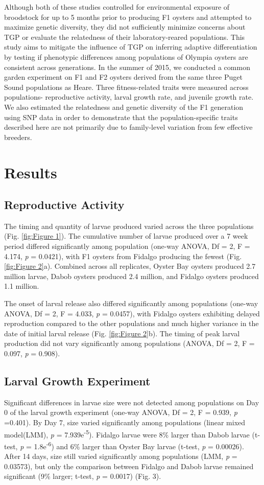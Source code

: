 \documentclass[fleqn,10pt]{wlscirep}
\begin{document}
Although both of these studies controlled for environmental exposure of broodstock for up to 5 months prior to producing F1 oysters and attempted to maximize genetic diversity, they did not sufficiently minimize concerns about TGP or evaluate the relatedness of their laboratory-reared populations. This study aims to mitigate the influence of TGP on inferring adaptive differentiation by testing if phenotypic differences among populations of Olympia oysters are consistent across generations. In the summer of 2015, we conducted a common garden experiment on F1 and F2 oysters derived from the same three Puget Sound populations as Heare. Three fitness-related traits were measured across populations- reproductive activity, larval growth rate, and juvenile growth rate. We also estimated the relatedness and genetic diversity of the F1 generation using SNP data in order to demonstrate that the population-specific traits described here are not primarily due to family-level variation from few effective breeders.

\section*{Results}
\subsection*{Reproductive Activity}
The timing and quantity of larvae produced varied across the three populations (Fig. \ref{fig:Figure 1}). The cumulative number of larvae produced over a 7 week period differed significantly among population (one-way ANOVA, Df = 2, F = 4.174, \textit{p} = 0.0421), with F1 oysters from Fidalgo producing the fewest (Fig. \ref{fig:Figure 2}a). Combined across all replicates, Oyster Bay oysters produced 2.7 million larvae, Dabob oysters produced 2.4 million, and Fidalgo oysters produced 1.1 million.\par
The onset of larval release also differed significantly among populations (one-way ANOVA, Df = 2, F = 4.033, \textit{p} = 0.0457), with Fidalgo oysters exhibiting delayed reproduction compared to the other populations and much higher variance in the date of initial larval release (Fig. \ref{fig:Figure 2}b). The timing of peak larval production did not vary significantly among populations (ANOVA, Df = 2, F = 0.097, \textit{p} = 0.908).

\subsection*{Larval Growth Experiment}
Significant differences in larvae size were not detected among populations on Day 0 of the larval growth experiment (one-way ANOVA, Df = 2, F = 0.939, \textit{p} =0.401). By Day 7, size varied significantly among populations (linear mixed model(LMM), \textit{p} = 7.939e\textsuperscript{-5}). Fidalgo larvae were 8\% larger than Dabob larvae (t-test, \textit{p} = 1.8e\textsuperscript{-6}) and 6\% larger than Oyster Bay larvae (t-test, \textit{p} = 0.00026). After 14 days, size still varied significantly among populations (LMM, \textit{p} = 0.03573), but only the comparison between Fidalgo and Dabob larvae remained significant (9\% larger; t-test, \textit{p} = 0.0017) (Fig. 3).
\end{document}
